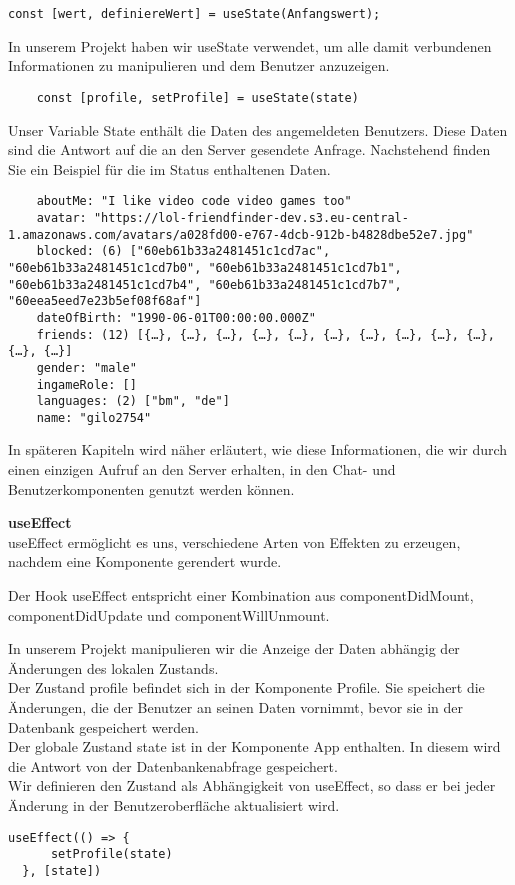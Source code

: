 \begin{lstlisting}
const [wert, definiereWert] = useState(Anfangswert);
\end{lstlisting}

In unserem Projekt haben wir useState verwendet, um alle damit verbundenen Informationen zu manipulieren und dem Benutzer anzuzeigen.
\begin{lstlisting}
    const [profile, setProfile] = useState(state)    
    \end{lstlisting}

\newpage
Unser Variable State enthält die Daten des angemeldeten Benutzers. Diese Daten sind die Antwort auf die an den Server gesendete Anfrage. 
Nachstehend finden Sie ein Beispiel für die im Status enthaltenen Daten.

\begin{lstlisting}
    aboutMe: "I like video code video games too"
    avatar: "https://lol-friendfinder-dev.s3.eu-central-1.amazonaws.com/avatars/a028fd00-e767-4dcb-912b-b4828dbe52e7.jpg"
    blocked: (6) ["60eb61b33a2481451c1cd7ac", "60eb61b33a2481451c1cd7b0", "60eb61b33a2481451c1cd7b1", "60eb61b33a2481451c1cd7b4", "60eb61b33a2481451c1cd7b7", "60eea5eed7e23b5ef08f68af"]
    dateOfBirth: "1990-06-01T00:00:00.000Z"
    friends: (12) [{…}, {…}, {…}, {…}, {…}, {…}, {…}, {…}, {…}, {…}, {…}, {…}]
    gender: "male"
    ingameRole: []
    languages: (2) ["bm", "de"]
    name: "gilo2754"
\end{lstlisting}
In späteren Kapiteln wird näher erläutert, wie diese Informationen, die wir durch einen einzigen Aufruf an den Server erhalten, in den Chat- und Benutzerkomponenten genutzt werden können. 

\textbf{useEffect}\\
useEffect ermöglicht es uns, verschiedene Arten von Effekten zu erzeugen, nachdem eine Komponente gerendert wurde. 

Der Hook useEffect entspricht einer Kombination aus componentDidMount, componentDidUpdate und componentWillUnmount.

In unserem Projekt manipulieren wir die Anzeige der Daten abhängig der Änderungen des lokalen Zustands.\\
Der Zustand profile befindet sich in der Komponente Profile.
Sie speichert die Änderungen, die der Benutzer an seinen Daten vornimmt, bevor sie in der Datenbank gespeichert werden.
\\
Der globale Zustand state ist in der Komponente App enthalten.
In diesem wird die Antwort von der Datenbankenabfrage gespeichert.
\\
Wir definieren den Zustand als Abhängigkeit von useEffect, so dass er bei jeder Änderung in der Benutzeroberfläche aktualisiert wird.
\\
\begin{lstlisting}
useEffect(() => { 
      setProfile(state)      
  }, [state])           
\end{lstlisting}

